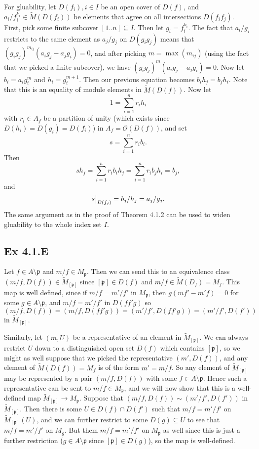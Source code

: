 \documentclass{article}
\newcommand\restr[2]{{%
  \left.\kern-\nulldelimiterspace %
  #1 %
  \vphantom{\big|} %
  \right|_{#2} %
  }}
\theoremstyle{definition}
\begin{document}
For gluability, let $D(f_i), i \in I$ be an open cover of $D(f)$, and
$a_i/f_i^{k_i} \in \widetilde{M}(D(f_i))$ be elements that agree on all
intersections $D(f_i f_j)$. First, pick some finite subcover $[1..n] \subseteq
	I$. Then let $g_i = f_i^{k_i}$. The fact that $a_i/g_i$ restricts to the same
element as $a_j/g_j$ on $D(g_i g_j)$ means that $(g_i g_j)^{m_{ij}} (a_i g_j -
	a_j g_i) = 0$, and after picking $m = \max(m_{ij})$ (using the fact that we
picked a finite subcover), we have $(g_i g_j)^{m} (a_i g_j - a_j g_i) = 0$. Now
let $b_i = a_i g_i^m$ and $h_i = g_i^{m + 1}$. Then our previous equation becomes
$b_i h_j = b_j h_i$. Note that this is an equality of module elements in
$\widetilde{M}(D(f))$. Now let
\[
	1 = \sum_{i = 1}^{n} r_i h_i
\]
with $r_i \in A_f$ be a partition of unity (which exists since $D(h_i) = D(g_i)
	= D(f_i)$) in $A_f = \mathcal{O}(D(f))$, and set
\[
	s
	=
	\sum_{i = 1}^{n} r_i b_i.
\]
Then
\[
	s h_j
	=
	\sum_{i = 1}^{n} r_i b_i h_j
	=
	\sum_{i = 1}^{n} r_i b_j h_i
	=
	b_j,
\]
and
\[
	\restr{s}{D(f_j)}
	=
	b_j/h_j
	=
	a_j/g_j.
\]
The same argument as in the proof of Theorem 4.1.2 can be used to widen
gluability to the whole index set $I$.


\subsection*{Ex 4.1.E}

Let $f \in A \setminus \mathfrak{p}$ and $m/f \in M_{\mathfrak{p}}$. Then we
can send this to an equivalence class $(m/f, D(f)) \in
	\widetilde{M}_{[\mathfrak{p}]}$ since $[\mathfrak{p}] \in D(f)$ and $m/f \in
	\widetilde{M}(D_f) = M_f$. This map is well defined, since if $m/f = m'/f'$ in
$M_{\mathfrak{p}}$, then $g(mf' - m'f) = 0$ for some $g \in A \setminus
	\mathfrak{p}$, and $m/f = m'/f'$ in $D(ff'g)$ so
\[
	(m/f, D(f)) = (m/f, D(ff'g)) = (m'/f', D(ff'g)) = (m'/f', D(f'))
\]
in $\widetilde{M}_{[\mathfrak{p}]}$.

Similarly, let $(m, U)$ be a representative of an element in
$\widetilde{M}_{[\mathfrak{p}]}$. We can always restrict $U$ down to a
distinguished open set $D(f)$ which contains $[\mathfrak{p}]$, so we might as
well suppose that we picked the representative $(m', D(f))$, and any element of
$\widetilde{M}(D(f)) = M_f$ is of the form $m' = m/f$. So any element of
$\widetilde{M}_{[\mathfrak{p}]}$ may be represented by a pair $(m/f, D(f))$
with some $f \in A \setminus \mathfrak{p}$. Hence such a representative can be
sent to $m/f \in M_{\mathfrak{p}}$, and we will now show that this is a
well-defined map $\widetilde{M}_{[\mathfrak{p}]} \to M_{\mathfrak{p}}$. Suppose
that $(m/f, D(f)) \sim (m'/f', D(f'))$ in $\widetilde{M}_{[\mathfrak{p}]}$.
Then there is some $U \in D(f) \cap D(f')$ such that $m/f = m'/f'$ on
$\widetilde{M}_{[\mathfrak{p}]}(U)$, and we can further restrict to some $D(g)
	\subseteq U$ to see that $m/f = m'/f'$ on $M_g$. But them $m/f = m'/f'$ on
$M_{\mathfrak{p}}$ as well since this is just a further restriction ($g \in A
	\setminus \mathfrak{p}$ since $[\mathfrak{p}] \in D(g)$), so the map is
well-defined. \\
\end{document}
